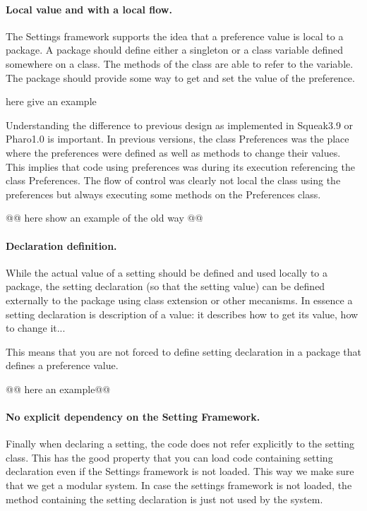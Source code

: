 \documentclass[a4paper,10pt,twoside]{book}
\begin{document}
\paragraph{Local value and with a local flow.}

The Settings framework supports the idea that a preference value is local to a package. A package should define either a singleton or a class variable defined somewhere on a class. The methods of the class are able to refer to the variable. The package should provide some way to get and set the value of the preference.

here give an example

Understanding the difference to previous design as implemented in Squeak3.9 or Pharo1.0 is important.
In previous versions, the class Preferences was the place where the preferences were defined as well as methods to change their values. This implies that code using preferences was during its execution referencing the class Preferences.
The flow of control was clearly not local the class using the preferences but always executing some methods on the Preferences class.



@@
here show an example of the old way
@@


\paragraph{Declaration definition.}
While the actual value of a setting should be defined and used locally to a package, the setting declaration (so that the setting value) can be defined externally to the package using class extension or other mecanisms.
In essence a setting declaration is description of a value: it describes how to get its value, how to change it...

This means that you are not forced to define setting declaration in a package that defines a preference value.

@@ here an example@@


\paragraph{No explicit dependency on the Setting Framework.}
Finally when declaring a setting, the code does not refer explicitly to the setting class. This has the good property 
that you can load code containing setting declaration even if the Settings framework is not loaded. This way we make sure 
that we get a modular system. In case the settings framework is not loaded, the method containing the setting declaration 
is just not used by the system.
\end{document}
